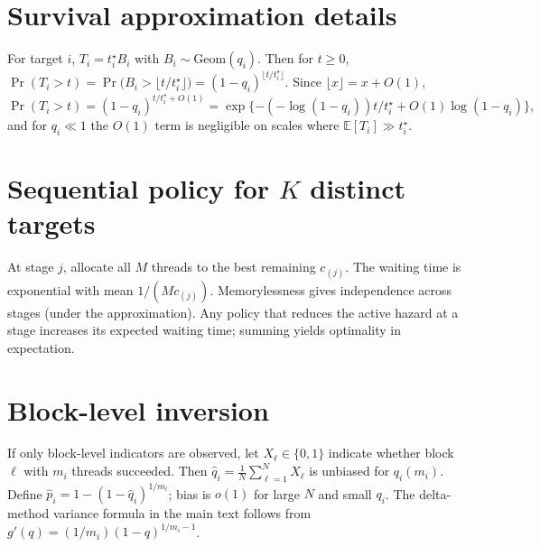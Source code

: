 \documentclass[11pt]{article}
\theoremstyle{definition}
\theoremstyle{remark}
\newcommand{\E}{\mathbb{E}}
\newcommand{\1}{\mathbbm{1}}
\begin{document}
\appendix

\section{Survival approximation details}
For target $i$, $T_i=t_i^\star B_i$ with $B_i\sim\mathrm{Geom}(q_i)$. Then for $t\ge 0$,
\(
\Pr(T_i>t)=\Pr\!\big(B_i> \lfloor t/t_i^\star\rfloor\big)=(1-q_i)^{\lfloor t/t_i^\star\rfloor}.
\)
Since $\lfloor x\rfloor=x+O(1)$,
\(
\Pr(T_i>t)=(1-q_i)^{t/t_i^\star+O(1)}=\exp\{-(-\log(1-q_i))t/t_i^\star + O(1)\log (1-q_i)\},
\)
and for $q_i\ll 1$ the $O(1)$ term is negligible on scales where $\E[T_i]\gg t_i^\star$.

\section{Sequential policy for $K$ distinct targets}
At stage $j$, allocate all $M$ threads to the best remaining $c_{(j)}$. The waiting time is exponential with mean $1/(M c_{(j)})$. Memorylessness gives independence across stages (under the approximation). Any policy that reduces the active hazard at a stage increases its expected waiting time; summing yields optimality in expectation.

\section{Block-level inversion}
If only block-level indicators are observed, let $X_\ell\in\{0,1\}$ indicate whether block $\ell$ with $m_i$ threads succeeded. Then $\hat q_i=\frac{1}{N}\sum_{\ell=1}^N X_\ell$ is unbiased for $q_i(m_i)$. Define $\hat p_i = 1-(1-\hat q_i)^{1/m_i}$; bias is $o(1)$ for large $N$ and small $q_i$. The delta-method variance formula in the main text follows from $g'(q)=(1/m_i)(1-q)^{1/m_i-1}$.

\printbibliography
\end{document}
